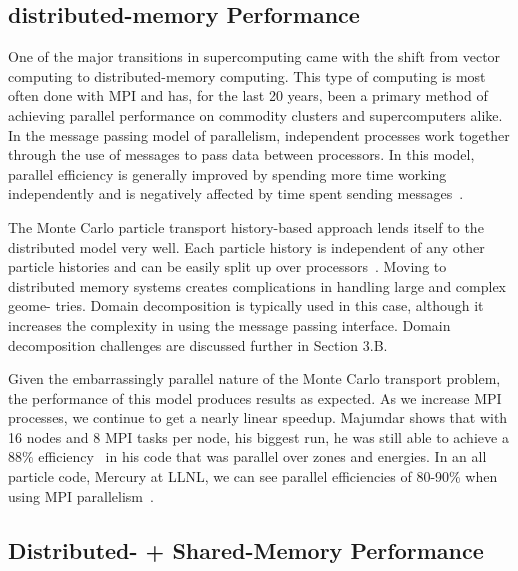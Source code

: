\subsection*{ \textbf{distributed-memory Performance}}

One of the major transitions in supercomputing came with the shift from vector computing to distributed-memory computing.
%
This type of computing is most often done with MPI and has, for the last 20 years, been a primary method of achieving parallel performance on commodity clusters and supercomputers alike.
%
In the message passing model of parallelism, independent processes work together through the use of messages to pass data between processors.
%
In this model, parallel efficiency is generally improved by spending more time working independently and is negatively affected by time spent sending messages~\cite{yanghybrid}.
%

%
The Monte Carlo particle transport history-based approach lends itself to the distributed model very well.
%
Each particle history is independent of any other particle histories and can be easily split up over processors~\cite{yanghybrid}.
%
Moving to distributed memory systems creates complications in handling large and complex geome- tries.
Domain decomposition is typically used in this case, although it increases the complexity in using the message passing interface.
%
Domain decomposition challenges are discussed further in Section 3.B.
%

%
Given the embarrassingly parallel nature of the Monte Carlo transport problem, the performance of this model produces results as expected.
%
As we increase MPI processes, we continue to get a nearly linear speedup.
%
Majumdar shows that with 16 nodes and 8 MPI tasks per node, his biggest run, he was still able to achieve a 88\% efficiency~\cite{majumdar2000parallel} in his code that was parallel over zones and energies.
%
In an all particle code, Mercury at LLNL, we can see parallel efficiencies of 80-90\% when using MPI parallelism~\cite{procassini2005load}.

\subsection*{ \textbf{Distributed- + Shared-Memory Performance}}

